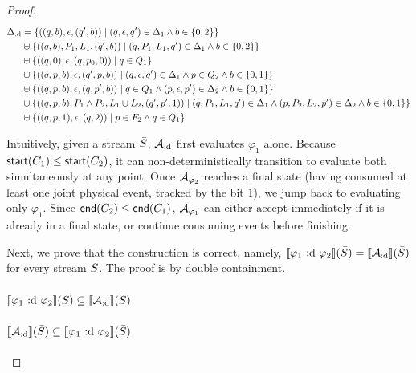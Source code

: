\begin{proof}
	$$\begin{aligned}[t] 		 		
		\Delta_{\text{:d}} 
		& = \{((q,b), \epsilon, (q',b)) \mid (q,\epsilon,q') \in \Delta_1 \land b \in \{0, 2\}\} \\ 		 		
		& \uplus \{((q,b), P_1, L_1, (q', b)) \mid (q,P_1, L_1,q') \in \Delta_1 \land b \in \{0, 2\}\} \\ 		 		
		& \uplus \{((q,0), \epsilon, (q, p_0, 0)) \mid q \in Q_1 \} \\ 		 		
		& \uplus \{((q, p, b), \epsilon, (q', p, b)) \mid (q, \epsilon, q') \in \Delta_1 \land p \in Q_2 \land b \in \{0, 1\}\}  \\ 		 		
		& \uplus \{((q, p, b), \epsilon, (q, p', b)) \mid q \in Q_1 \land (p, \epsilon, p') \in \Delta_2 \land b \in \{0, 1\}\}  \\ 		 		
		& \uplus \{((q, p, b), P_1 \land P_2, L_1 \cup L_2, (q', p', 1)) \mid (q, P_1, L_1, q') \in \Delta_1 \land (p, P_2, L_2, p') \in \Delta_2 \land b \in \{0, 1\}\} \\ 		 		
		& \uplus \{((q, p, 1), \epsilon, (q, 2)) \mid p \in F_2 \land q \in Q_1\} 	 	\end{aligned}$$
	
	Intuitively, given a stream $\bar{S}$, $\mathcal{A}_{\text{:d}}$ first evaluates $\varphi_1$ alone. Because $\mathsf{start}(C_1) \leq \mathsf{start}(C_2)$, it can non-deterministically transition to evaluate both simultaneously at any point. Once $\mathcal{A}_{\varphi_2}$ reaches a final state (having consumed at least one joint physical event, tracked by the bit $1$), we jump back to evaluating only $\varphi_1$. Since $\mathsf{end}(C_2) \leq \mathsf{end}(C_1)$, $\mathcal{A}_{\varphi_1}$ can either accept immediately if it is already in a final state, or continue consuming events before finishing.
	
	Next, we prove that the construction is correct, namely, $\sem{\varphi_1 \during \varphi_2}(\Stream) = \sem{\cAduring}(\Stream)$ for every stream $\bar{S}$. The proof is by double containment.
	
	\paragraph{$\sem{\varphi_1 \during \varphi_2}(\Stream) \subseteq \sem{\cAduring}(\Stream)$}
	
	\paragraph{$\sem{\cAduring}(\Stream) \subseteq \sem{\varphi_1 \during \varphi_2}(\Stream)$}
\end{proof}